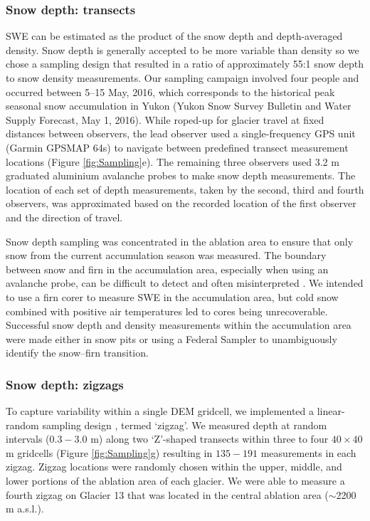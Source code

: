 \documentclass[twocolumn, letterpaper]{igs}
\begin{document}
\subsubsection{Snow depth: transects}

SWE can be estimated as the product of the snow depth and depth-averaged density. Snow depth is generally accepted to be more variable than density \citep{Elder1991, Clark2011, Lopez2013} so we chose a sampling design that resulted in a ratio of approximately 55:1 snow depth to snow density measurements. Our sampling campaign involved four people and occurred between 5--15 May, 2016, which corresponds to the historical peak seasonal snow accumulation in Yukon (Yukon Snow Survey Bulletin and Water Supply Forecast, May 1, 2016). While roped-up for glacier travel at fixed distances between observers, the lead observer used a single-frequency GPS unit (Garmin GPSMAP 64s) to navigate between predefined transect measurement locations (Figure \ref{fig:Sampling}e). The remaining three observers used 3.2 m graduated aluminium avalanche probes to make snow depth measurements. The location of each set of depth measurements, taken by the second, third and fourth observers, was approximated based on the recorded location of the first observer and the direction of travel. 

Snow depth sampling was concentrated in the ablation area to ensure that only snow from the current accumulation season was measured. The boundary between snow and firn in the accumulation area, especially when using an avalanche probe, can be difficult to detect and often misinterpreted \citep{Grunewald2010,Sold2013}. We intended to use a firn corer to measure SWE in the accumulation area, but cold snow combined with positive air temperatures led to cores being unrecoverable. Successful snow depth and density measurements within the accumulation area were made either in snow pits or using a Federal Sampler to unambiguously identify the snow--firn transition. 

\subsubsection{Snow depth: zigzags}

To capture variability within a single DEM gridcell, we implemented a linear-random sampling design \citep{Shea2010}, termed `zigzag'. We measured depth at random intervals ($0.3 - 3.0$ m) along two `Z'-shaped transects within three to four $40\times40$ m gridcells (Figure \ref{fig:Sampling}g) resulting in $135-191$ measurements in each zigzag. Zigzag locations were randomly chosen within the upper, middle, and lower portions of the ablation area of each glacier. We were able to measure a fourth zigzag on Glacier 13 that was located in the central ablation area ($\sim$2200 m a.s.l.).
\end{document}
